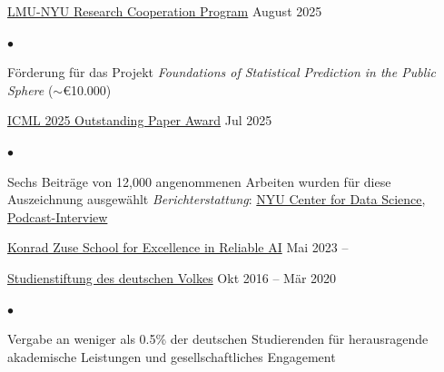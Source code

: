 \documentclass[margin,line, 10pt]{res}
\newenvironment{list2}{
	\begin{list}{$\bullet$}{%
			\setlength{\itemsep}{0in}
			\setlength{\parsep}{0in} \setlength{\parskip}{0in}
			\setlength{\topsep}{0in} \setlength{\partopsep}{0in} 
			\setlength{\leftmargin}{0.2in}}}{\end{list}}
\begin{document}
\begin{resume}
		\href{https://www.lmu.de/en/about-lmu/international-network/lmu-nyu-research-cooperation-program/}{LMU-NYU Research Cooperation Program} \hfill {August 2025} \\
		
		\begin{list2}
			\vspace*{-0.3cm}
			\item F\"orderung f\"ur das Projekt \textit{Foundations of Statistical Prediction in the Public Sphere} ($\sim$€10.000)
		\end{list2}
		\vspace*{-0.3cm}
		\newpage
		\href{https://icml.cc/virtual/2025/awards_detail}{ICML 2025 Outstanding Paper Award} \hfill {Jul 2025} \\
		
		\begin{list2}
			\vspace*{-0.3cm}
			\item Sechs Beiträge von 12,000 angenommenen Arbeiten wurden für diese Auszeichnung ausgewählt \textit{Berichterstattung}: \href{https://nyudatascience.medium.com/helping-the-worst-off-when-hiring-more-case-workers-beats-building-better-ai-12e6f968de0b}{NYU Center for Data Science}, \href{https://open.spotify.com/episode/0UyhJ1wmxUQ5afI6jnql85?si=2366cf2f93e946f7}{Podcast-Interview}
		\end{list2}
		
		\vspace*{-0.3cm}
		\href{https://zuseschoolrelai.de}{Konrad Zuse School for Excellence in Reliable AI} \hfill {Mai 2023 --} 
		
		
		\vspace*{-0.3cm}
		\href{https://www.studienstiftung.de/en/about-us}{Studienstiftung des deutschen Volkes} \hfill {Okt 2016 -- M\"ar 2020}\\
		\begin{list2}
			\vspace*{-0.3cm}
			\item Vergabe an weniger als 0.5\% der deutschen Studierenden f\"ur herausragende akademische Leistungen und gesellschaftliches Engagement
		\end{list2}
		

\end{resume}
\end{document}
